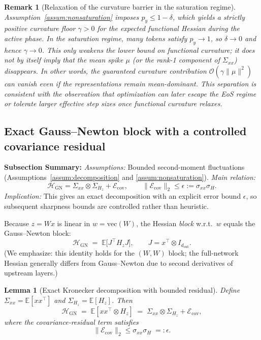 \documentclass[11pt]{article}
\newtheorem{lemma}{Lemma}
\newtheorem{remark}{Remark}
\begin{document}
\begin{remark}[Relaxation of the curvature barrier in the saturation regime]
\label{remark:saturation}
Assumption~\ref{assum:nonsaturation} imposes $p_y \le 1-\delta$, which yields a strictly positive curvature floor $\gamma>0$ for the expected functional Hessian during the active phase.
In the saturation regime, many tokens satisfy $p_y \to 1$, so $\delta \to 0$ and hence $\gamma \to 0$.
This only weakens the \emph{lower bound} on functional curvature; it does not by itself imply that the mean spike $\mu$ (or the rank-1 component of $\Sigma_{xx}$) disappears.
In other words, the guaranteed curvature contribution $\mathcal{O}(\gamma\|\mu\|^2)$ can vanish even if the representations remain mean-dominant.
This separation is consistent with the observation that optimization can later escape the EoS regime or tolerate larger effective step sizes once functional curvature relaxes.
\end{remark}

\subsection{Exact Gauss--Newton block with a controlled covariance residual}

\textbf{Subsection Summary:}
\textit{Assumptions:} Bounded second-moment fluctuations (Assumptions~\ref{assum:decomposition} and \ref{assum:nonsaturation}).
\textit{Main relation:} 
\[
\mathcal{H}_{\mathrm{GN}}=\Sigma_{xx}\otimes\Sigma_{H_z}+\mathcal{E}_{\mathrm{cov}},
\qquad
\|\mathcal{E}_{\mathrm{cov}}\|_2\le\epsilon:=\sigma_{xx}\sigma_H.
\]
\textit{Implication:} This gives an exact decomposition with an explicit error bound $\epsilon$, so subsequent sharpness bounds are controlled rather than heuristic.

Because $z=Wx$ is linear in $w=\mathrm{vec}(W)$, the Hessian \emph{block} w.r.t.\ $w$ equals the Gauss--Newton block:
\[
\mathcal{H}_{\mathrm{GN}} \;=\;
\mathbb{E}\bigl[J^\top H_z J\bigr],
\qquad
J = x^\top\otimes I_{d_{\mathrm{out}}}.
\]
(We emphasize: this identity holds for the $(W,W)$ block; the full-network Hessian generally differs from Gauss--Newton due to second derivatives of upstream layers.)

\begin{lemma}[Exact Kronecker decomposition with bounded residual]
\label{lemma:exact_kfac}
Define $\Sigma_{xx}=\mathbb{E}[xx^\top]$ and $\Sigma_{H_z}=\mathbb{E}[H_z]$.
Then
\begin{equation}
  \mathcal{H}_{\mathrm{GN}}
  \;=\;
  \mathbb{E}[xx^\top\otimes H_z]
  \;=\;
  \Sigma_{xx}\otimes \Sigma_{H_z} + \mathcal{E}_{\mathrm{cov}},
\end{equation}
where the covariance-residual term satisfies
\[
\|\mathcal{E}_{\mathrm{cov}}\|_2 \le \sigma_{xx}\sigma_H \;=: \epsilon.
\]
\end{lemma}
\end{document}
